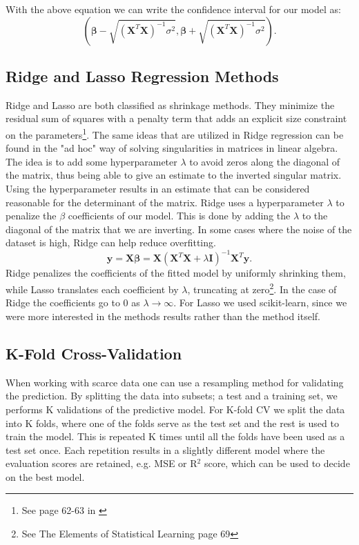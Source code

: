 \documentclass[%
 reprint,
nofootinbib,
 amsmath,amssymb,
 aps,
]{revtex4-2}
\begin{document}
With the above equation we can write the confidence interval for our model as:
%
\begin{equation*}\label{eq:CIbeta}
    (\boldsymbol{\beta} -  \sqrt{(\boldsymbol{X}^{T}\boldsymbol{X})^{-1} \sigma^{2}}, \boldsymbol{\beta} + \sqrt{(\boldsymbol{X}^{T}\boldsymbol{X})^{-1} \sigma^{2}}).
\end{equation*}
%


\subsection{Ridge and Lasso Regression Methods}
Ridge and Lasso are both classified as shrinkage methods. They minimize the residual sum of squares with a penalty term that adds an explicit size constraint on the parameters\footnote{See page 62-63 in \cite{Hastie}}.
The same ideas that are utilized in Ridge regression can be found in the "ad hoc" way of solving singularities in matrices in linear algebra. The idea is to add some hyperparameter $\lambda$ to avoid zeros along the diagonal of the matrix, thus being able to give an estimate to the inverted singular matrix. Using the hyperparameter results in an estimate that can be considered reasonable for the determinant of the matrix. Ridge uses a hyperparameter $\lambda$ to penalize the $\beta$ coefficients of our model. This is done by adding the $\lambda$ to the diagonal of the matrix that we are inverting. In some cases where the noise of the dataset is high, Ridge can help reduce overfitting.
%
\begin{equation}\label{eq:Ridge}
    \boldsymbol{y} = \boldsymbol{X}\boldsymbol{\beta} = \boldsymbol{X}(\boldsymbol{X}^{T}\boldsymbol{X} + \lambda \boldsymbol{I})^{-1}\boldsymbol{X}^{T}\boldsymbol{y}.
\end{equation}
%
Ridge penalizes the coefficients of the fitted model by uniformly shrinking them, while Lasso translates each coefficient by $\lambda$, truncating at zero\footnote{See The Elements of Statistical Learning \cite{Hastie} page 69}. In the case of Ridge the coefficients go to $0$ as $\lambda \rightarrow \infty$. For Lasso we used scikit-learn, since we were more interested in the methods results rather than the method itself.

\subsection{K-Fold Cross-Validation}
When working with scarce data one can use a resampling method for validating the prediction. By splitting the data into subsets; a test and a training set, we performs K validations of the predictive model. For K-fold CV
we split the data into K folds, where one of the folds serve as the test set and the rest is used to train the model. This is repeated K times until all the folds have been used as a test set once. Each repetition results in a slightly different model where the evaluation scores are retained, e.g. MSE or R$^2$ score, which can be used to decide on the best model.
\end{document}
